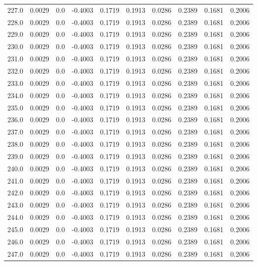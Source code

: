 \begin{longtable}{lrrrrrrrrr}
227.0 & 0.0029 & 0.0 & -0.4003 & 0.1719 & 0.1913 & 0.0286 & 0.2389 & 0.1681 & 0.2006 \\
228.0 & 0.0029 & 0.0 & -0.4003 & 0.1719 & 0.1913 & 0.0286 & 0.2389 & 0.1681 & 0.2006 \\
229.0 & 0.0029 & 0.0 & -0.4003 & 0.1719 & 0.1913 & 0.0286 & 0.2389 & 0.1681 & 0.2006 \\
230.0 & 0.0029 & 0.0 & -0.4003 & 0.1719 & 0.1913 & 0.0286 & 0.2389 & 0.1681 & 0.2006 \\
231.0 & 0.0029 & 0.0 & -0.4003 & 0.1719 & 0.1913 & 0.0286 & 0.2389 & 0.1681 & 0.2006 \\
232.0 & 0.0029 & 0.0 & -0.4003 & 0.1719 & 0.1913 & 0.0286 & 0.2389 & 0.1681 & 0.2006 \\
233.0 & 0.0029 & 0.0 & -0.4003 & 0.1719 & 0.1913 & 0.0286 & 0.2389 & 0.1681 & 0.2006 \\
234.0 & 0.0029 & 0.0 & -0.4003 & 0.1719 & 0.1913 & 0.0286 & 0.2389 & 0.1681 & 0.2006 \\
235.0 & 0.0029 & 0.0 & -0.4003 & 0.1719 & 0.1913 & 0.0286 & 0.2389 & 0.1681 & 0.2006 \\
236.0 & 0.0029 & 0.0 & -0.4003 & 0.1719 & 0.1913 & 0.0286 & 0.2389 & 0.1681 & 0.2006 \\
237.0 & 0.0029 & 0.0 & -0.4003 & 0.1719 & 0.1913 & 0.0286 & 0.2389 & 0.1681 & 0.2006 \\
238.0 & 0.0029 & 0.0 & -0.4003 & 0.1719 & 0.1913 & 0.0286 & 0.2389 & 0.1681 & 0.2006 \\
239.0 & 0.0029 & 0.0 & -0.4003 & 0.1719 & 0.1913 & 0.0286 & 0.2389 & 0.1681 & 0.2006 \\
240.0 & 0.0029 & 0.0 & -0.4003 & 0.1719 & 0.1913 & 0.0286 & 0.2389 & 0.1681 & 0.2006 \\
241.0 & 0.0029 & 0.0 & -0.4003 & 0.1719 & 0.1913 & 0.0286 & 0.2389 & 0.1681 & 0.2006 \\
242.0 & 0.0029 & 0.0 & -0.4003 & 0.1719 & 0.1913 & 0.0286 & 0.2389 & 0.1681 & 0.2006 \\
243.0 & 0.0029 & 0.0 & -0.4003 & 0.1719 & 0.1913 & 0.0286 & 0.2389 & 0.1681 & 0.2006 \\
244.0 & 0.0029 & 0.0 & -0.4003 & 0.1719 & 0.1913 & 0.0286 & 0.2389 & 0.1681 & 0.2006 \\
245.0 & 0.0029 & 0.0 & -0.4003 & 0.1719 & 0.1913 & 0.0286 & 0.2389 & 0.1681 & 0.2006 \\
246.0 & 0.0029 & 0.0 & -0.4003 & 0.1719 & 0.1913 & 0.0286 & 0.2389 & 0.1681 & 0.2006 \\
247.0 & 0.0029 & 0.0 & -0.4003 & 0.1719 & 0.1913 & 0.0286 & 0.2389 & 0.1681 & 0.2006 \\

\end{longtable}
